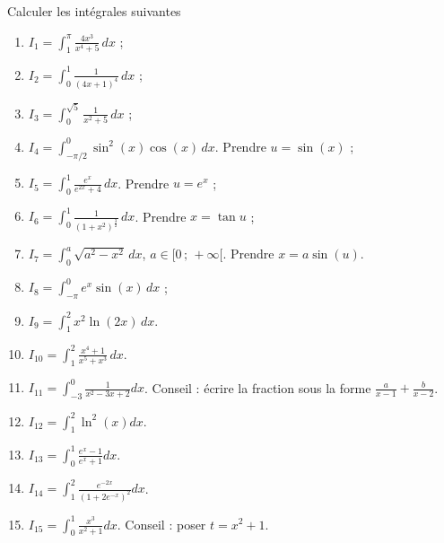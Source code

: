 
\begin{exercice}\label{exomazhe-0011}
 
  Calculer les intégrales suivantes 
  \begin{multicols}{2}
    \begin{enumerate}
    \item $I_{1}=\displaystyle \int_{1}^{\pi} \frac{4x^3}{x^4+5}\, dx$ ;
    \item $I_{2}=\displaystyle \int_{0}^{1}\frac{1}{(4x+1)^4}\, dx $ ;
    \item $I_{3}=\displaystyle \int_{0}^{\sqrt{5}}\frac{1}{x^2+5}\, dx$ ;
    \item $I_{4}=\displaystyle \int_{-\pi/2}^{0} \sin^2(x)\cos(x) \, dx $. Prendre $u=\sin(x)$ ;
    \item $I_{5}=\displaystyle\int_{0}^{1}\frac{e^x}{e^{2x}+4} \, dx$. Prendre $u = e^x$ ;
    \item $I_{6}=\displaystyle\int_{0}^{1}\frac{1}{(1+x^2)^{\frac{3}{2}}}\, dx $. Prendre $x=\tan u$ ;
    \item $I_{7}=\displaystyle\int_{0}^{a}\sqrt{a^2-x^2} \, dx$, $a \in [0\,;\,+\infty[$.  Prendre $x=a\sin (u)$. 
      \item $\displaystyle I_{8}=\int_{-\pi}^{0} e^x\sin(x) \, dx $ ;
      \item $\displaystyle I_{9}=\int_{1}^{2} x^2\ln(2x) \, dx$.
      \item $\displaystyle I_{10}=\int_{1}^{2}\frac{x^4+1}{x^5+x^3}\, dx $.
      \item $\displaystyle I_{11}=\int_{-3}^0\frac{1}{ x^2-3x+2 }dx$. Conseil : écrire la fraction sous la forme $\frac{ a }{ x-1 }+\frac{ b }{ x-2 }$.
      \item $\displaystyle I_{12}=\int_1^2\ln^2(x)dx$.
      \item  $\displaystyle I_{13}=\int_0^1\frac{ e^x-1 }{ e^x+1 }dx$.
      \item $\displaystyle I_{14}=\int_1^2\frac{  e^{-2x} }{ (1+2 e^{-x})^2 }dx$.
      \item $\displaystyle I_{15}=\int_0^1\frac{ x^3 }{ x^2+1 }dx$. Conseil : poser $t=x^2+1$.
  \end{enumerate}
\end{multicols}
  
\end{exercice}
